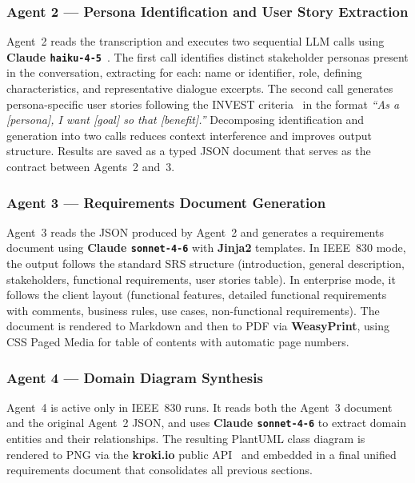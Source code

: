 \documentclass[sigconf]{acmart}
\begin{document}
\subsubsection{Agent 2 --- Persona Identification and User Story
Extraction}

Agent~2 reads the transcription and executes two sequential LLM
calls using \textbf{Claude \texttt{haiku-4-5}}~\cite{anthropic2025claude}.
The first call identifies distinct stakeholder personas present in the
conversation, extracting for each: name or identifier, role, defining
characteristics, and representative dialogue excerpts. The second
call generates persona-specific user stories following the INVEST
criteria~\cite{wake2003invest} in the format \textit{``As a [persona],
I want [goal] so that [benefit].''} Decomposing identification and
generation into two calls reduces context interference and improves
output structure. Results are saved as a typed JSON document that
serves as the contract between Agents~2 and~3.

\subsubsection{Agent 3 --- Requirements Document Generation}

Agent~3 reads the JSON produced by Agent~2 and generates a
requirements document using \textbf{Claude \texttt{sonnet-4-6}}
with \textbf{Jinja2} templates. In IEEE~830 mode, the output follows
the standard SRS structure (introduction, general description,
stakeholders, functional requirements, user stories table). In
enterprise mode, it follows the client layout (functional features,
detailed functional requirements with comments, business rules,
use cases, non-functional requirements). The document is rendered
to Markdown and then to PDF via \textbf{WeasyPrint}, using CSS
Paged Media for table of contents with automatic page numbers.

\subsubsection{Agent 4 --- Domain Diagram Synthesis}

Agent~4 is active only in IEEE~830 runs. It reads both the Agent~3
document and the original Agent~2 JSON, and uses \textbf{Claude
\texttt{sonnet-4-6}} to extract domain entities and their
relationships. The resulting PlantUML class diagram is rendered to
PNG via the \textbf{kroki.io} public API~\cite{groq2025} and embedded
in a final unified requirements document that consolidates all
previous sections.
\end{document}
